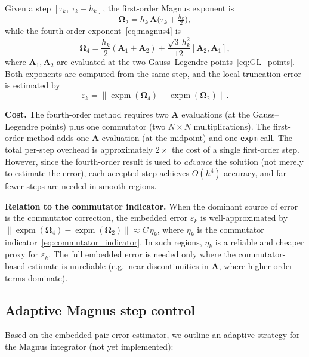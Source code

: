 \documentclass[11pt,a4paper]{article}
\newcommand{\mat}[1]{\mathbf{#1}}
\theoremstyle{definition}
\begin{document}
Given a step $[\tau_k,\,\tau_k+h_k]$, the first-order Magnus exponent
is
\begin{equation}\label{eq:magnus1_embed}
  \mat{\Omega}_2 = h_k\,\mat{A}\bigl(\tau_k+\tfrac{h_k}{2}\bigr),
\end{equation}
while the fourth-order exponent~\eqref{eq:magnus4} is
\begin{equation}\label{eq:magnus4_embed}
  \mat{\Omega}_4 = \frac{h_k}{2}(\mat{A}_1+\mat{A}_2)
  + \frac{\sqrt{3}\,h_k^2}{12}[\mat{A}_2,\mat{A}_1],
\end{equation}
where $\mat{A}_1,\mat{A}_2$ are evaluated at the two Gauss--Legendre
points~\eqref{eq:GL_points}.  Both exponents are computed from the same
step, and the local truncation error is estimated by
\begin{equation}\label{eq:embed_error}
  \varepsilon_k = \bigl\|\operatorname{expm}(\mat{\Omega}_4)
  - \operatorname{expm}(\mat{\Omega}_2)\bigr\|.
\end{equation}

\textbf{Cost.}  The fourth-order method requires two $\mat{A}$
evaluations (at the Gauss--Legendre points) plus one commutator (two
$N\!\times\!N$ multiplications).  The first-order method adds one
$\mat{A}$ evaluation (at the midpoint) and one \texttt{expm} call.  The
total per-step overhead is approximately $2\times$ the cost of a single
first-order step.  However, since the fourth-order result is used to
\emph{advance} the solution (not merely to estimate the error), each
accepted step achieves $O(h^4)$ accuracy, and far fewer steps are needed
in smooth regions.

\textbf{Relation to the commutator indicator.}  When the dominant
source of error is the commutator correction, the embedded error
$\varepsilon_k$ is well-approximated by
$\|\operatorname{expm}(\mat{\Omega}_4)
-\operatorname{expm}(\mat{\Omega}_2)\|\approx C\,\eta_k$, where
$\eta_k$ is the commutator indicator~\eqref{eq:commutator_indicator}.
In such regions, $\eta_k$ is a reliable and cheaper proxy for
$\varepsilon_k$.  The full embedded error is needed only where the
commutator-based estimate is unreliable (e.g.\ near discontinuities in
$\mat{A}$, where higher-order terms dominate).

\subsection{Adaptive Magnus step control}\label{sec:adapt_magnus}

Based on the embedded-pair error estimator, we outline an adaptive
strategy for the Magnus integrator (not yet implemented):
\end{document}
